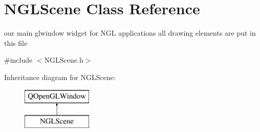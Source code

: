 \hypertarget{classNGLScene}{}\section{N\+G\+L\+Scene Class Reference}
\label{classNGLScene}


our main glwindow widget for N\+GL applications all drawing elements are put in this file  




{\ttfamily \#include $<$N\+G\+L\+Scene.\+h$>$}

Inheritance diagram for N\+G\+L\+Scene\+:\begin{figure}[H]
\begin{center}
\leavevmode
\includegraphics[height=2.000000cm]{classNGLScene}
\end{center}
\end{figure}
